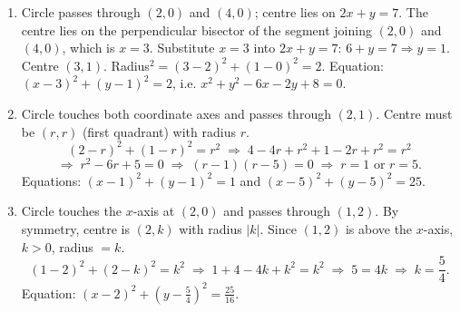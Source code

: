 \documentclass[11pt]{article}
\begin{document}
\begin{corrige}
\begin{enumerate}
\item Circle passes through $(2,0)$ and $(4,0)$; centre lies on $2x+y=7$.
The centre lies on the perpendicular bisector of the segment joining $(2,0)$ and $(4,0)$, which is $x=3$.
Substitute $x=3$ into $2x+y=7$: $6+y=7 \Rightarrow y=1$. Centre $(3,1)$.
Radius$^{2}=(3-2)^{2}+(1-0)^{2}=2$.
Equation: $(x-3)^{2}+(y-1)^{2}=2$, i.e. $x^{2}+y^{2}-6x-2y+8=0$.
\item Circle touches both coordinate axes and passes through $(2,1)$.
Centre must be $(r,r)$ (first quadrant) with radius $r$.
\[
(2-r)^{2}+(1-r)^{2}=r^{2} \;\Longrightarrow\; 4-4r+r^{2}+1-2r+r^{2}=r^{2}
\]
\[
\Longrightarrow\; r^{2}-6r+5=0 \;\Longrightarrow\; (r-1)(r-5)=0 \;\Longrightarrow\; r=1 \text{ or } r=5.
\]
Equations: $(x-1)^{2}+(y-1)^{2}=1$ and $(x-5)^{2}+(y-5)^{2}=25$.
\item Circle touches the $x$-axis at $(2,0)$ and passes through $(1,2)$.
By symmetry, centre is $(2,k)$ with radius $|k|$. Since $(1,2)$ is above the $x$-axis, $k>0$, radius $=k$.
\[
(1-2)^{2}+(2-k)^{2}=k^{2} \;\Longrightarrow\; 1+4-4k+k^{2}=k^{2} \;\Longrightarrow\; 5=4k \;\Longrightarrow\; k=\frac{5}{4}.
\]
Equation: $(x-2)^{2}+\left(y-\frac{5}{4}\right)^{2}=\frac{25}{16}$.
\end{enumerate}
\end{corrige}
\end{document}

